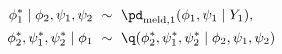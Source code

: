 \begin{align}
  \phi_{1}^{*} \mid \phi_{2}, \psi_{1}, \psi_{2} \,\, &\sim \,\, \pd_{\text{meld}, 1}(\phi_{1}, \psi_{1} \mid Y_{1}), \\ 
  \phi_{2}^{*}, \psi_{1}^{*}, \psi_{2}^{*} \mid \phi_{1} \,\, &\sim \,\, \q(\phi_{2}^{*}, \psi_{1}^{*}, \psi_{2}^{*} \mid \phi_{2}, \psi_{1}, \psi_{2})
  \label{eqn:stage-two-proposals}
\end{align}